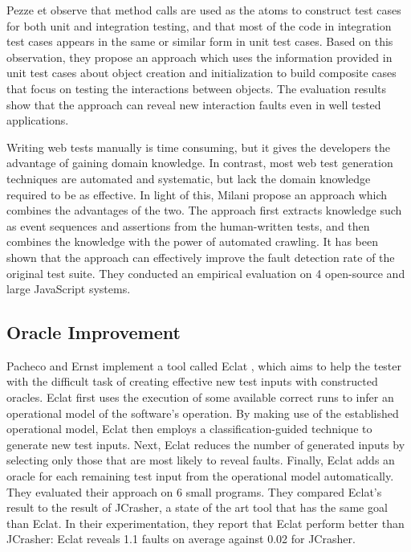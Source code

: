 Pezze et \etal\cite{pezze2013} observe that method calls are used as the atoms to construct test cases for both unit and integration testing, and that most of the code in integration test cases
appears in the same or similar form in unit test cases. 
Based on this observation, they propose an approach which uses the information provided in unit test cases about object creation and initialization to build composite cases that focus on testing the interactions between objects. 
The evaluation results show that the approach can reveal new interaction faults even in well tested applications. 

Writing web tests manually is time consuming, but it gives the developers the advantage of gaining domain knowledge. 
In contrast, most web test generation techniques are automated and systematic, but lack the domain knowledge required to be as effective. 
In light of this, Milani \etal\cite{milani2014} propose an approach which combines the advantages of the two. 
The approach first extracts knowledge such as event sequences and assertions from the human-written tests, and then combines the knowledge with the power of automated crawling. 
It has been shown that the approach can effectively improve the fault detection rate of the original test suite.
They conducted an empirical evaluation on 4 open-source and large JavaScript systems. 

\subsection{Oracle Improvement}
\label{subsec:sota:category-1:oracle-improvement}

Pacheco and Ernst implement a tool called Eclat \cite{Pacheco2005}, which aims to help the tester with the difficult task of creating effective new test inputs with constructed oracles. 
Eclat first uses the execution of some available correct runs to infer an operational model of the software's operation. 
By making use of the established operational model, Eclat then employs a classification-guided technique to generate new test inputs. 
Next, Eclat reduces the number of generated inputs by selecting only those that are most likely to reveal faults. 
Finally, Eclat adds an oracle for each remaining test input from the operational model automatically. 
They evaluated their approach on 6 small programs. 
They compared Eclat's result to the result of JCrasher, a state of the art tool that has the same goal than Eclat. 
In their experimentation, they report that Eclat perform better than JCrasher: Eclat reveals 1.1 faults on average against 0.02 for JCrasher.

